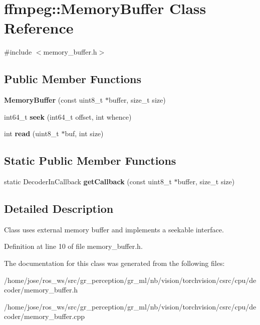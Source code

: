 \hypertarget{classffmpeg_1_1MemoryBuffer}{}\section{ffmpeg\+:\+:Memory\+Buffer Class Reference}
\label{classffmpeg_1_1MemoryBuffer}


{\ttfamily \#include $<$memory\+\_\+buffer.\+h$>$}

\subsection*{Public Member Functions}
\begin{DoxyCompactItemize}
\item 
\mbox{\label{classffmpeg_1_1MemoryBuffer_a0b3773f4b0d97d3ffd1f37ca32ca0111}} 
{\bfseries Memory\+Buffer} (const uint8\+\_\+t $\ast$buffer, size\+\_\+t size)
\item 
\mbox{\label{classffmpeg_1_1MemoryBuffer_ad36b257873c64078b5beeb002aa908c1}} 
int64\+\_\+t {\bfseries seek} (int64\+\_\+t offset, int whence)
\item 
\mbox{\label{classffmpeg_1_1MemoryBuffer_a47e714dd1f06fff3140d97c8be67f016}} 
int {\bfseries read} (uint8\+\_\+t $\ast$buf, int size)
\end{DoxyCompactItemize}
\subsection*{Static Public Member Functions}
\begin{DoxyCompactItemize}
\item 
\mbox{\label{classffmpeg_1_1MemoryBuffer_a4403d38644b643562da9e20438a4ff66}} 
static Decoder\+In\+Callback {\bfseries get\+Callback} (const uint8\+\_\+t $\ast$buffer, size\+\_\+t size)
\end{DoxyCompactItemize}


\subsection{Detailed Description}
Class uses external memory buffer and implements a seekable interface. 

Definition at line 10 of file memory\+\_\+buffer.\+h.



The documentation for this class was generated from the following files\+:\begin{DoxyCompactItemize}
\item 
/home/jose/ros\+\_\+ws/src/gr\+\_\+perception/gr\+\_\+ml/nb/vision/torchvision/csrc/cpu/decoder/memory\+\_\+buffer.\+h\item 
/home/jose/ros\+\_\+ws/src/gr\+\_\+perception/gr\+\_\+ml/nb/vision/torchvision/csrc/cpu/decoder/memory\+\_\+buffer.\+cpp\end{DoxyCompactItemize}
